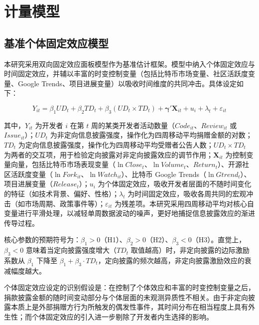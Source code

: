 \documentclass[
    type = master, %
    degree = professional,        %
    decl-page,  %
    twoside,                %
    fontset = fandol %
  ]{njuthesis}
\begin{document}
\section{计量模型}
\label{sec:model-1}

\subsection{基准个体固定效应模型}
\label{sec:fe-model}

本研究采用双向固定效应面板模型作为基准估计框架。模型中纳入个体固定效应与时间固定效应，并辅以丰富的时变控制变量（包括比特币市场变量、社区活跃度变量、Google Trends、项目进展变量）以吸收时间维度的共同冲击。具体设定如下：

\begin{equation}
\label{eq:fe-model}
Y_{it} = \beta_1 UD_t + \beta_2 TD_t
       + \beta_3 (UD_t \times TD_t)
       + \boldsymbol{\gamma}' \mathbf{X}_{it} + u_i + \lambda_t + \varepsilon_{it}
\end{equation}

其中，$Y_{it}$ 为开发者 $i$ 在第 $t$ 周的某类开发者活动数量（$\mathit{Code}_{it}$、$\mathit{Review}_{it}$ 或 $\mathit{Issue}_{it}$）；$\mathit{UD}_t$ 为非定向信息披露强度，操作化为四周移动平均捐赠金额的对数；$\mathit{TD}_t$ 为定向信息披露强度，操作化为四周移动平均受赠者公告人数；$\mathit{UD}_t \times \mathit{TD}_t$ 为两者的交互项，用于检验定向披露对非定向披露效应的调节作用；$\mathbf{X}_{it}$ 为控制变量向量，包括比特币市场表现变量（$\ln\mathit{Close}_t$、$\ln\mathit{Volume}_t$、$\mathit{Return}_t$）、开源社区活跃度变量（$\ln\mathit{Fork}_{it}$、$\ln\mathit{Watch}_{it}$）、比特币 Google Trends（$\ln\mathit{Gtrend}_t$）、项目进展变量（$\mathit{Release}_t$）；$u_i$ 为个体固定效应，吸收开发者层面的不随时间变化的特征（如技术背景、偏好、性格）；$\lambda_t$ 为时间固定效应，吸收各周共同的宏观冲击（如市场周期、政策事件等）；$\varepsilon_{it}$ 为残差项。本研究采用四周移动平均对核心自变量进行平滑处理，以减轻单周数据波动的噪声，更好地捕捉信息披露效应的渐进传导过程。

核心参数的预期符号为：$\beta_1 > 0$（H1）、$\beta_2 > 0$（H2）、$\beta_3 < 0$（H3）。直觉上，$\beta_3 < 0$ 意味着当定向披露强度增大（$\mathit{TD}_t$ 取值越高）时，非定向披露的边际激励系数从 $\beta_1$ 下降至 $\beta_1 + \beta_3 \cdot TD_t$，定向披露的频次越高，非定向披露激励效应的衰减幅度越大。

个体固定效应设定的识别假设是：在控制了个体效应和丰富的时变控制变量之后，捐款披露金额的随时间变动部分与个体层面的未观测异质性不相关。由于非定向披露本质上是外部捐赠方行为所触发的偶发性事件，其时间分布在相当程度上具有外生性；而个体固定效应的引入进一步剔除了开发者内生选择的影响。
\end{document}
